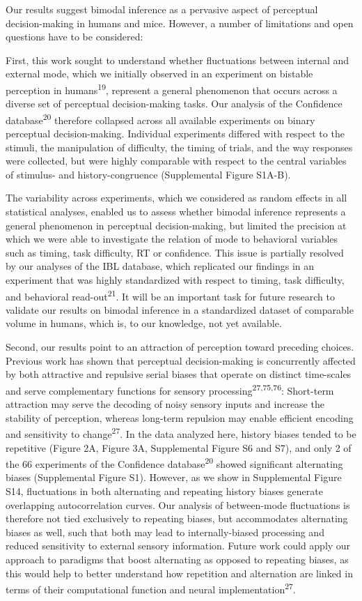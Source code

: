 \documentclass[
]{article}
\begin{document}
Our results suggest bimodal inference as a pervasive aspect of
perceptual decision-making in humans and mice. However, a number of
limitations and open questions have to be considered:

First, this work sought to understand whether fluctuations between
internal and external mode, which we initially observed in an experiment
on bistable perception in humans\textsuperscript{19}, represent a
general phenomenon that occurs across a diverse set of perceptual
decision-making tasks. Our analysis of the Confidence
database\textsuperscript{20} therefore collapsed across all available
experiments on binary perceptual decision-making. Individual experiments
differed with respect to the stimuli, the manipulation of difficulty,
the timing of trials, and the way responses were collected, but were
highly comparable with respect to the central variables of stimulus- and
history-congruence (Supplemental Figure S1A-B).

The variability across experiments, which we considered as random
effects in all statistical analyses, enabled us to assess whether
bimodal inference represents a general phenomenon in perceptual
decision-making, but limited the precision at which we were able to
investigate the relation of mode to behavioral variables such as timing,
task difficulty, RT or confidence. This issue is partially resolved by
our analyses of the IBL database, which replicated our findings in an
experiment that was highly standardized with respect to timing, task
difficulty, and behavioral read-out\textsuperscript{21}. It will be an
important task for future research to validate our results on bimodal
inference in a standardized dataset of comparable volume in humans,
which is, to our knowledge, not yet available.

Second, our results point to an attraction of perception toward
preceding choices. Previous work has shown that perceptual
decision-making is concurrently affected by both attractive and
repulsive serial biases that operate on distinct time-scales and serve
complementary functions for sensory
processing\textsuperscript{27,75,76}: Short-term attraction may serve
the decoding of noisy sensory inputs and increase the stability of
perception, whereas long-term repulsion may enable efficient encoding
and sensitivity to change\textsuperscript{27}. In the data analyzed
here, history biases tended to be repetitive (Figure 2A, Figure 3A,
Supplemental Figure S6 and S7), and only 2 of the 66 experiments of the
Confidence database\textsuperscript{20} showed significant alternating
biases (Supplemental Figure S1). However, as we show in Supplemental
Figure S14, fluctuations in both alternating and repeating history
biases generate overlapping autocorrelation curves. Our analysis of
between-mode fluctuations is therefore not tied exclusively to repeating
biases, but accommodates alternating biases as well, such that both may
lead to internally-biased processing and reduced sensitivity to external
sensory information. Future work could apply our approach to paradigms
that boost alternating as opposed to repeating biases, as this would
help to better understand how repetition and alternation are linked in
terms of their computational function and neural
implementation\textsuperscript{27}.
\end{document}
